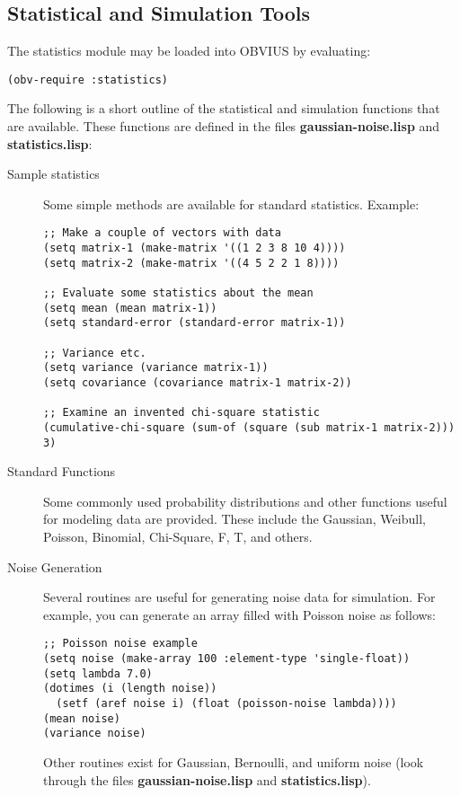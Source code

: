 \subsection{Statistical and Simulation Tools}

The statistics module may be loaded into OBVIUS by evaluating:
\begin{verbatim}
(obv-require :statistics)
\end{verbatim}

The following is a short outline of the statistical and simulation
functions that are available.  These functions are defined in the
files {\bf gaussian-noise.lisp} and {\bf statistics.lisp}:
\begin {description}
\item[Sample statistics] Some simple methods are available for
standard statistics.  Example:
\begin{verbatim}
;; Make a couple of vectors with data
(setq matrix-1 (make-matrix '((1 2 3 8 10 4))))
(setq matrix-2 (make-matrix '((4 5 2 2 1 8))))

;; Evaluate some statistics about the mean
(setq mean (mean matrix-1))
(setq standard-error (standard-error matrix-1))

;; Variance etc.
(setq variance (variance matrix-1))
(setq covariance (covariance matrix-1 matrix-2))

;; Examine an invented chi-square statistic
(cumulative-chi-square (sum-of (square (sub matrix-1 matrix-2))) 3)
\end{verbatim}

\item[Standard Functions] Some commonly used probability distributions
and other functions useful for modeling data are provided.  These
include the Gaussian, Weibull, Poisson, Binomial, Chi-Square, F, T, and
others.

\item[Noise Generation] Several routines are useful 
for generating noise data for simulation.  For example, you can
generate an array filled with Poisson noise as follows:
\begin{verbatim}
;; Poisson noise example
(setq noise (make-array 100 :element-type 'single-float))
(setq lambda 7.0)
(dotimes (i (length noise))
  (setf (aref noise i) (float (poisson-noise lambda))))
(mean noise)
(variance noise)
\end{verbatim}
Other routines exist for Gaussian, Bernoulli, and uniform noise (look
through the files {\bf gaussian-noise.lisp} and {\bf statistics.lisp}).
\end{description}


